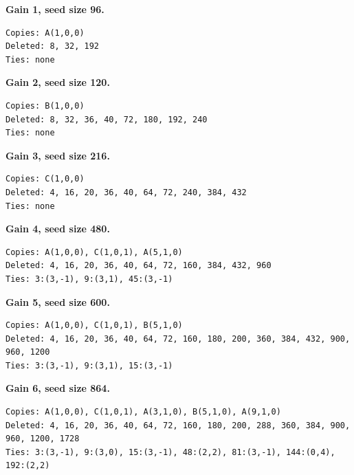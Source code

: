 \noindent\textbf{Gain 1, seed size 96.}
\begin{scriptsize}
\begin{verbatim}
Copies: A(1,0,0)
Deleted: 8, 32, 192
Ties: none
\end{verbatim}
\end{scriptsize}

\noindent\textbf{Gain 2, seed size 120.}
\begin{scriptsize}
\begin{verbatim}
Copies: B(1,0,0)
Deleted: 8, 32, 36, 40, 72, 180, 192, 240
Ties: none
\end{verbatim}
\end{scriptsize}

\noindent\textbf{Gain 3, seed size 216.}
\begin{scriptsize}
\begin{verbatim}
Copies: C(1,0,0)
Deleted: 4, 16, 20, 36, 40, 64, 72, 240, 384, 432
Ties: none
\end{verbatim}
\end{scriptsize}

\noindent\textbf{Gain 4, seed size 480.}
\begin{scriptsize}
\begin{verbatim}
Copies: A(1,0,0), C(1,0,1), A(5,1,0)
Deleted: 4, 16, 20, 36, 40, 64, 72, 160, 384, 432, 960
Ties: 3:(3,-1), 9:(3,1), 45:(3,-1)
\end{verbatim}
\end{scriptsize}

\noindent\textbf{Gain 5, seed size 600.}
\begin{scriptsize}
\begin{verbatim}
Copies: A(1,0,0), C(1,0,1), B(5,1,0)
Deleted: 4, 16, 20, 36, 40, 64, 72, 160, 180, 200, 360, 384, 432, 900, 960, 1200
Ties: 3:(3,-1), 9:(3,1), 15:(3,-1)
\end{verbatim}
\end{scriptsize}

\noindent\textbf{Gain 6, seed size 864.}
\begin{scriptsize}
\begin{verbatim}
Copies: A(1,0,0), C(1,0,1), A(3,1,0), B(5,1,0), A(9,1,0)
Deleted: 4, 16, 20, 36, 40, 64, 72, 160, 180, 200, 288, 360, 384, 900, 960, 1200, 1728
Ties: 3:(3,-1), 9:(3,0), 15:(3,-1), 48:(2,2), 81:(3,-1), 144:(0,4), 192:(2,2)
\end{verbatim}
\end{scriptsize}

